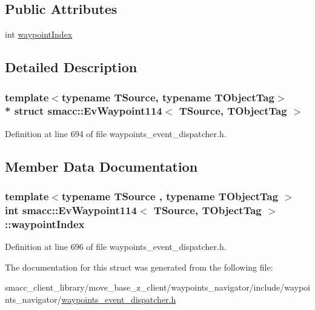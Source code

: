 \subsection*{Public Attributes}
\begin{DoxyCompactItemize}
\item 
int \hyperlink{structsmacc_1_1EvWaypoint114_a269a20be16d564934828a179def5b742}{waypoint\+Index}
\end{DoxyCompactItemize}


\subsection{Detailed Description}
\subsubsection*{template$<$typename T\+Source, typename T\+Object\+Tag$>$\\*
struct smacc\+::\+Ev\+Waypoint114$<$ T\+Source, T\+Object\+Tag $>$}



Definition at line 694 of file waypoints\+\_\+event\+\_\+dispatcher.\+h.



\subsection{Member Data Documentation}
\subsubsection[{\texorpdfstring{waypoint\+Index}{waypointIndex}}]{\setlength{\rightskip}{0pt plus 5cm}template$<$typename T\+Source , typename T\+Object\+Tag $>$ int {\bf smacc\+::\+Ev\+Waypoint114}$<$ T\+Source, T\+Object\+Tag $>$\+::waypoint\+Index}\hypertarget{structsmacc_1_1EvWaypoint114_a269a20be16d564934828a179def5b742}{}\label{structsmacc_1_1EvWaypoint114_a269a20be16d564934828a179def5b742}


Definition at line 696 of file waypoints\+\_\+event\+\_\+dispatcher.\+h.



The documentation for this struct was generated from the following file\+:\begin{DoxyCompactItemize}
\item 
smacc\+\_\+client\+\_\+library/move\+\_\+base\+\_\+z\+\_\+client/waypoints\+\_\+navigator/include/waypoints\+\_\+navigator/\hyperlink{waypoints__event__dispatcher_8h}{waypoints\+\_\+event\+\_\+dispatcher.\+h}\end{DoxyCompactItemize}
